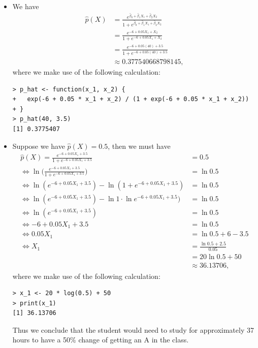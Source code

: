 \begin{itemize}
    \item[(a)] We have
        \begin{equation*}
            \begin{split}
                \hat{p}(X) &= \frac{e^{\hat{\beta}_0 + \hat{\beta}_1 X_1 + \hat{\beta}_2 X_2}}
                {1 + e^{\hat{\beta}_0 + \hat{\beta}_1 X_1 + \hat{\beta}_2 X_2}} \\
                &= \frac{e^{-6 + 0.05 X_1 + X_2}}{1 + e^{-6 + 0.05 X_1 + X_2}} \\
                &= \frac{e^{-6 + 0.05 (40) + 3.5}}{1 + e^{-6 + 0.05 (40) + 3.5}} \\
                &\approx 0.377540668798145,
            \end{split}
        \end{equation*}
        where we make use of the following calculation:
        \begin{lstlisting}
> p_hat <- function(x_1, x_2) {
+   exp(-6 + 0.05 * x_1 + x_2) / (1 + exp(-6 + 0.05 * x_1 + x_2))
+ }
> p_hat(40, 3.5)
[1] 0.3775407
        \end{lstlisting}
    \item[(b)] Suppose we have $\hat{p}(X) = 0.5$, then we must have
        \begin{equation*}
            \begin{split}
                \hat{p}(X) = \frac{e^{-6 + 0.05 X_1 + 3.5}}{1 + e^{-6 + 0.05 X_1 + 3.5}}
                &= 0.5 \\
                \Leftrightarrow \ln{\biggl(\frac{e^{-6 + 0.05 X_1 + 3.5}}
                {1 + e^{-6 + 0.05 X_1 + 3.5}}\biggr)} &= \ln{0.5} \\
                \Leftrightarrow \ln{(e^{-6 + 0.05 X_1 + 3.5})}
                - \ln{(1 + e^{-6 + 0.05 X_1 + 3.5})} &= \ln{0.5} \\
                \Leftrightarrow \ln{(e^{-6 + 0.05 X_1 + 3.5})}
                - \ln{1}\cdot\ln{e^{-6 + 0.05 X_1 + 3.5})} &= \ln{0.5} \\
                \Leftrightarrow \ln{(e^{-6 + 0.05 X_1 + 3.5})} &= \ln{0.5} \\
                \Leftrightarrow -6 + 0.05 X_1 + 3.5 &= \ln{0.5} \\
                \Leftrightarrow 0.05 X_1 &= \ln{0.5} + 6 - 3.5 \\
                \Leftrightarrow X_1 &= \frac{\ln{0.5} + 2.5}{0.05} \\
                &= 20\ln{0.5} + 50 \\
                &\approx 36.13706,
            \end{split}
        \end{equation*}
        where we make use of the following calculation:
        \begin{lstlisting}
> x_1 <- 20 * log(0.5) + 50
> print(x_1)
[1] 36.13706
        \end{lstlisting}
        Thus we conclude that the student would need to study for approximately 37
        hours to have a 50\% change of getting an A in the class.
\end{itemize}
